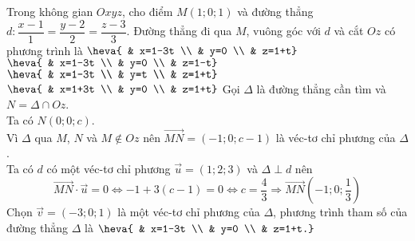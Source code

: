\begin{ex}%
Trong không gian $Oxyz$, cho điểm $M(1;0;1)$ và đường thẳng $d\colon \dfrac{x-1}{1}=\dfrac{y-2}{2}=\dfrac{z-3}{3}$. Đường thẳng đi qua $M$, vuông góc với $d$ và cắt $Oz$ có phương trình là
\choice
{\True $\heva{ & x=1-3t \\ & y=0 \\ & z=1+t}$}
{$\heva{ & x=1-3t \\ & y=0 \\ & z=1-t}$}
{$\heva{ & x=1-3t \\ & y=t \\ & z=1+t}$}
{$\heva{ & x=1+3t \\ & y=0 \\ & z=1+t}$}
\loigiai
{
Gọi $\Delta$ là đường thẳng cần tìm và $N=\Delta \cap Oz$.\\
Ta có $N(0;0;c)$. \\
Vì $\Delta$ qua $M$, $N$ và $M\notin Oz$ nên $\overrightarrow{MN}=(-1;0;c-1)$ là véc-tơ chỉ phương của $\Delta$.\\
Ta có $d$ có một véc-tơ chỉ phương $\overrightarrow{u}=(1;2;3)$ và $\Delta \perp d$ nên
\[\overrightarrow{MN}\cdot\overrightarrow{u}=0 \Leftrightarrow -1+3(c-1)=0 \Leftrightarrow c=\dfrac{4}{3} \Rightarrow \overrightarrow{MN}\left(-1;0;\dfrac{1}{3}\right)\]
Chọn $\overrightarrow{v}=(-3;0;1)$ là một véc-tơ chỉ phương của $\Delta$, phương trình tham số của đường thẳng $\Delta$ là $\heva{ & x=1-3t \\ & y=0 \\ & z=1+t.}$
}
\end{ex}

